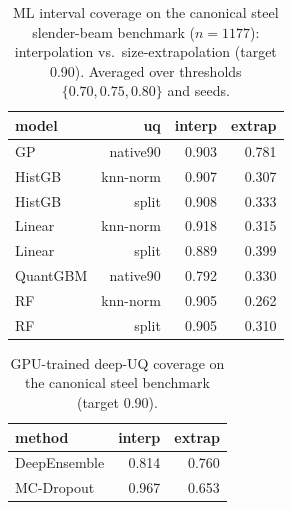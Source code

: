 \documentclass[11pt]{article}
\begin{document}
\begin{table}[h]\centering\small
\caption{ML interval coverage on the canonical steel slender-beam benchmark ($n=1177$): interpolation vs.\ size-extrapolation (target 0.90). Averaged over thresholds $\{0.70,0.75,0.80\}$ and seeds.}\label{tab:s3}
\begin{tabular}{lrrr}
\toprule
\textbf{model} & \textbf{uq} & \textbf{interp} & \textbf{extrap} \\
\midrule
GP & native90 & 0.903 & 0.781 \\
HistGB & knn-norm & 0.907 & 0.307 \\
HistGB & split & 0.908 & 0.333 \\
Linear & knn-norm & 0.918 & 0.315 \\
Linear & split & 0.889 & 0.399 \\
QuantGBM & native90 & 0.792 & 0.330 \\
RF & knn-norm & 0.905 & 0.262 \\
RF & split & 0.905 & 0.310 \\
\bottomrule
\end{tabular}
\end{table}

\begin{table}[h]\centering\small
\caption{GPU-trained deep-UQ coverage on the canonical steel benchmark (target 0.90).}\label{tab:s4}
\begin{tabular}{lrr}
\toprule
\textbf{method} & \textbf{interp} & \textbf{extrap} \\
\midrule
DeepEnsemble & 0.814 & 0.760 \\
MC-Dropout & 0.967 & 0.653 \\
\bottomrule
\end{tabular}
\end{table}
\end{document}
